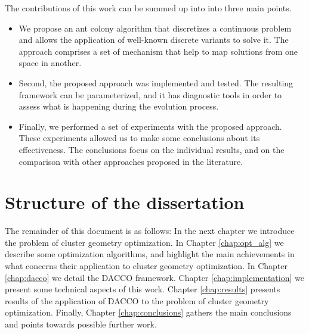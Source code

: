 The contributions of this work can be summed up into into three main points. 
\begin{itemize}
	\item We propose an ant colony algorithm that discretizes a continuous problem and allows the application of well-known discrete variants to solve it. The approach comprises a set of mechanism that help to map solutions from one space in another.

	\item Second, the proposed approach was implemented and tested. The resulting framework can be parameterized, and it has diagnostic tools in order to assess what is happening during the evolution process. 

	\item Finally, we performed a set of experiments with the proposed approach. These experiments allowed us to make some conclusions about its effectiveness. The conclusions focus on the individual results, and on the comparison with other approaches proposed in the literature.

\end{itemize}

\section{Structure of the dissertation}
The remainder of this document is as follows: In the next chapter we introduce the problem of cluster geometry optimization. In Chapter \ref{chap:opt_alg} we describe some optimization algorithms, and highlight the main achievements in what concerns their application to cluster geometry optimization. In Chapter \ref{chap:dacco} we detail the DACCO framework. Chapter \ref{chap:implementation} we present some technical aspects of this work. Chapter \ref{chap:results} presents results of the application of DACCO to the problem of cluster geometry optimization. Finally, Chapter \ref{chap:conclusions} gathers the main conclusions and points towards possible further work.

